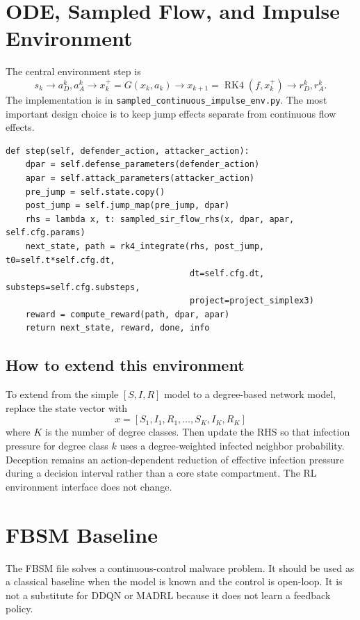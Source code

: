 \documentclass[11pt,a4paper]{article}
\begin{document}
\section{ODE, Sampled Flow, and Impulse Environment}
The central environment step is
\begin{equation}
\boxed{s_k}\rightarrow\boxed{a_D^k,a_A^k}\rightarrow\boxed{x_k^+=G(x_k,a_k)}\rightarrow\boxed{x_{k+1}=\operatorname{RK4}(f,x_k^+)}\rightarrow\boxed{r_D^k,r_A^k}.
\end{equation}
The implementation is in \texttt{sampled\_continuous\_impulse\_env.py}. The most important design choice is to keep jump effects separate from continuous flow effects.

\begin{lstlisting}[style=pythonstyle,caption={Core idea of a sampled-data flow and impulse environment step.}]
def step(self, defender_action, attacker_action):
    dpar = self.defense_parameters(defender_action)
    apar = self.attack_parameters(attacker_action)
    pre_jump = self.state.copy()
    post_jump = self.jump_map(pre_jump, dpar)
    rhs = lambda x, t: sampled_sir_flow_rhs(x, dpar, apar, self.cfg.params)
    next_state, path = rk4_integrate(rhs, post_jump, t0=self.t*self.cfg.dt,
                                     dt=self.cfg.dt, substeps=self.cfg.substeps,
                                     project=project_simplex3)
    reward = compute_reward(path, dpar, apar)
    return next_state, reward, done, info
\end{lstlisting}

\subsection{How to extend this environment}
To extend from the simple $[S,I,R]$ model to a degree-based network model, replace the state vector with
\begin{equation}
x=[S_1,I_1,R_1,\ldots,S_K,I_K,R_K]
\end{equation}
where $K$ is the number of degree classes. Then update the RHS so that infection pressure for degree class $k$ uses a degree-weighted infected neighbor probability. Deception remains an action-dependent reduction of effective infection pressure during a decision interval rather than a core state compartment. The RL environment interface does not change.

\section{FBSM Baseline}
The FBSM file solves a continuous-control malware problem. It should be used as a classical baseline when the model is known and the control is open-loop. It is not a substitute for DDQN or MADRL because it does not learn a feedback policy.
\end{document}
